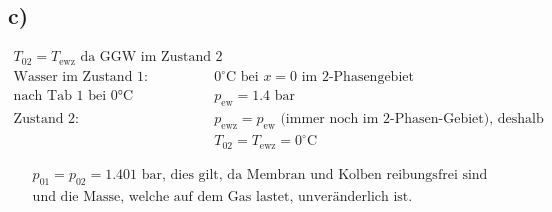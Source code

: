 

\subsection*{c)}
\begin{align*}
    T_{02} = T_{\text{ewz}} \text{ da GGW im Zustand 2} \\
    \text{Wasser im Zustand 1: } & 0^\circ \text{C bei } x = 0 \text{ im 2-Phasengebiet} \\
    \text{nach Tab 1 bei 0°C } & p_{\text{ew}} = 1.4 \text{ bar} \\
    \text{Zustand 2: } & p_{\text{ewz}} = p_{\text{ew}} \text{ (immer noch im 2-Phasen-Gebiet), deshalb} \\
    & T_{02} = T_{\text{ewz}} = 0^\circ \text{C}
\end{align*}

\begin{align*}
    p_{01} = p_{02} = 1.401 \text{ bar, dies gilt, da Membran und Kolben reibungsfrei sind} \\
    \text{und die Masse, welche auf dem Gas lastet, unveränderlich ist.}
\end{align*}
